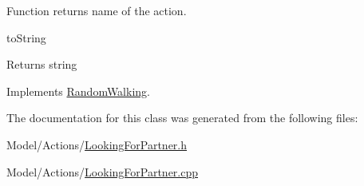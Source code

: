 Function returns name of the action. 

to\+String \begin{DoxyReturn}{Returns}
string 
\end{DoxyReturn}


Implements \hyperlink{class_random_walking_a86f089cc5cc28d179e248c67477e8b30}{Random\+Walking}.



The documentation for this class was generated from the following files\+:\begin{DoxyCompactItemize}
\item 
Model/\+Actions/\hyperlink{_looking_for_partner_8h}{Looking\+For\+Partner.\+h}\item 
Model/\+Actions/\hyperlink{_looking_for_partner_8cpp}{Looking\+For\+Partner.\+cpp}\end{DoxyCompactItemize}
